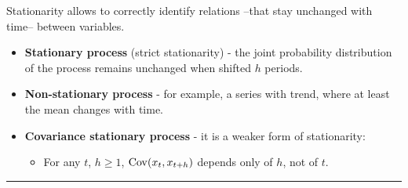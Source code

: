   \begin{f}[Stationarity]

Stationarity allows to correctly identify relations --that stay unchanged with time-- between variables.

\begin{itemize}[leftmargin=*]
	\item \textbf{Stationary process} (strict stationarity) - the joint probability distribution of the process remains unchanged when shifted \(h\) periods.
	\item \textbf{Non-stationary process} - for example, a series with trend, where at least the mean changes with time.
	\item \textbf{Covariance stationary process} - it is a weaker form of stationarity:
	
	\begin{itemize}[leftmargin=*]
		
		\item For any \(t\), \(h \geq 1\), \(\mathrm{Cov}(x_{t}, x_{t + h})\) depends only of \(h\), not of \(t\).
	\end{itemize}
\end{itemize}

\end{f}  \hrule

